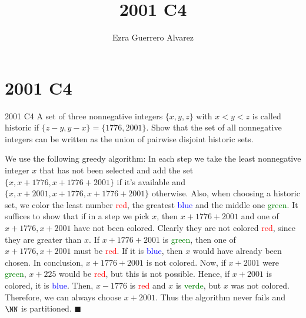 \documentclass[14pt]{article}
\title{2001 C4}
\author{Ezra Guerrero Alvarez}
\begin{document}
\maketitle
	
\section*{2001 C4}

\begin{statement}{2001 C4}
	A set of three nonnegative integers $\{x,y,z\}$ with $x < y < z$ is called historic if $\{z-y,y-x\} = \{1776,2001\}$. Show that the set of all nonnegative integers can be written as the union of pairwise disjoint historic sets.
\end{statement}
We use the following greedy algorithm: In each step we take the least nonnegative integer $x$ that has not been selected and add the set $\{x,x+1776,x+1776+2001\}$ if it's available and $\{x,x+2001,x+1776,x+1776+2001\}$ otherwise. Also, when choosing a historic set, we color the least number \textcolor{red}{red}, the greatest \textcolor{blue}{blue} and the middle one \textcolor{green}{green}. It suffices to show that if in a step we pick $x$, then $x+1776+2001$ and one of $x+1776,x+2001$ have not been colored. Clearly they are not colored \textcolor{red}{red}, since they are greater than $x$. If $x+1776+2001$ is \textcolor{green}{green}, then one of $x+1776,x+2001$ must be \textcolor{red}{red}. If it is \textcolor{blue}{blue}, then $x$ would have already been chosen. In conclusion, $x+1776+2001$ is not colored. Now, if $x+2001$ were \textcolor{green}{green}, $x+225$ would be \textcolor{red}{red}, but this is not possible. Hence, if $x+2001$ is colored, it is \textcolor{blue}{blue}. Then, $x-1776$ is \textcolor{red}{red} and $x$ is \textcolor{green}{verde}, but $x$ was not colored. Therefore, we can always choose $x+2001$. Thus the algorithm never fails and $\NN$ is partitioned. $\blacksquare$
	
\end{document}
